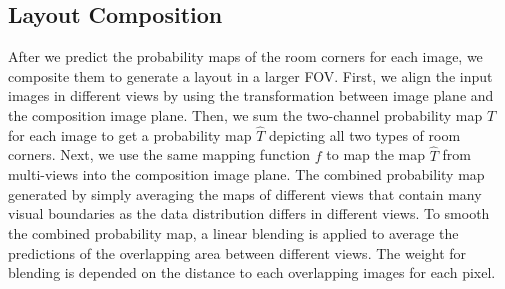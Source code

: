 




\subsection{Layout Composition}
\label{sec:merging}
After we predict the probability maps of the room corners for each image, we composite them to generate a layout in a larger FOV. 
First, we align the input images in different views by using the transformation between image plane and the composition image plane. 
Then, we sum the two-channel probability map $T$ for each image to get a probability map $\hat{T}$ depicting all two types of room corners. 
Next, we use the same mapping function $f$ to map the map $\hat{T}$ from multi-views into the composition image plane.
%
The combined probability map generated by simply averaging the maps of different views that contain many visual boundaries as the data distribution differs in different views. To smooth the combined probability map, a linear blending is applied to average the predictions of the overlapping area between different views. The weight for blending is depended on the distance to each overlapping images for each pixel.

